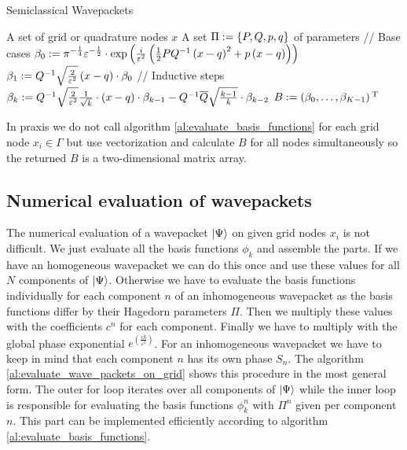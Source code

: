 \begin{chapter}{Semiclassical Wavepackets}
\begin{algorithm}
\caption{Evaluate basis functions $\phi_k\ofs{x}$ of semiclassical wavepackets}
\label{al:evaluate_basis_functions}
\begin{algorithmic}
  \REQUIRE A set of grid or quadrature nodes $x$
  \REQUIRE A set $\Pi := \{P,Q,p,q\}$ of parameters
  \STATE // Base cases
  \STATE $\beta_0 := \pi^{-\frac{1}{4}} \varepsilon^{-\frac{1}{2}}
               \cdot \exp\left( \frac{i}{\varepsilon^2} \left(\frac{1}{2} P Q^{-1}
                               \left( x - q \right)^2
                               + p \left( x - q \right) \right)
                        \right)$
  \STATE $\beta_1 := Q^{-1} \sqrt{\frac{2}{\varepsilon^2}} \left(x-q\right) \cdot \beta_0$
  \STATE // Inductive steps
    \STATE $\beta_k := Q^{-1} \sqrt{\frac{2}{\varepsilon^2}} \frac{1}{\sqrt{k}}
                         \cdot \left(x-q\right) \cdot \beta_{k-1}
                         - Q^{-1} \overline{Q} \sqrt{\frac{k-1}{k}} \cdot \beta_{k-2}$
  \ENDFOR
  \RETURN $B := \left(\beta_0, \ldots, \beta_{K-1}\right){}^{\textnormal{T}}$
\end{algorithmic}
\end{algorithm}

In praxis we do not call algorithm \ref{al:evaluate_basis_functions} for each grid
node $x_i \in \Gamma$ but use vectorization and calculate $B$ for all nodes
simultaneously so the returned $B$ is a two-dimensional matrix array.

\subsection{Numerical evaluation of wavepackets}

The numerical evaluation of a wavepacket $\Ket{\Psi}$ on given grid nodes $x_i$
is not difficult. We just evaluate all the basis functions $\phi_k$ and assemble the parts.
If we have an homogeneous wavepacket we can do this once and use these values
for all $N$ components of $\Ket{\Psi}$. Otherwise we have to evaluate the basis
functions individually for each component $n$ of an inhomogeneous wavepacket as
the basis functions differ by their Hagedorn parameters $\Pi$. Then we multiply
these values with the coefficients $c^n$ for each component. Finally we have to
multiply with the global phase exponential $e^{\left(\frac{i S}{\varepsilon^2}\right)}$.
For an inhomogeneous wavepacket we have to keep in mind that each component $n$
has its own phase $S_n$. The algorithm \ref{al:evaluate_wave_packets_on_grid}
shows this procedure in the most general form. The outer for loop iterates over
all components of $\Ket{\Psi}$ while the inner loop is responsible for evaluating
the basis functions $\phi_k^n$ with $\Pi^n$ given per component $n$. This part can
be implemented efficiently according to algorithm \ref{al:evaluate_basis_functions}.


\end{chapter}
